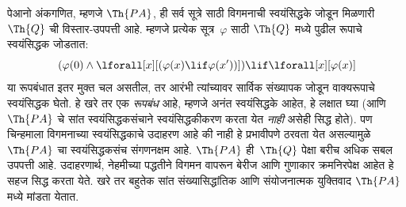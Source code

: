 पेआनो अंकगणित, म्हणजे $\Th{PA}$, ही
सर्व सूत्रे साठी विगमनाची स्वयंसिद्धके
जोडून मिळणारी $\Th{Q}$ ची विस्तार-उपपत्ती
आहे. म्हणजे प्रत्येक सूत्र~$\varphi$
साठी $\Th{Q}$ मध्ये पुढील रूपाचे
स्वयंसिद्धक जोडतात:
\[(\varphi(0) \land \lforall[x][(\varphi(x) \lif \varphi(x'))]) \lif \lforall[x][\varphi(x)]
\]
या रूपबंधात इतर मुक्त चल असतील, तर आरंभी त्यांच्यावर
सार्विक संख्यापक जोडून वाक्यरूपाचे स्वयंसिद्धक घेतो.
हे खरे तर एक \emph{रूपबंध} आहे, म्हणजे
अनंत स्वयंसिद्धके आहेत, हे लक्षात घ्या
(आणि $\Th{PA}$ चे सांत
स्वयंसिद्धकसंचाने स्वयंसिद्धकीकरण करता येत
{\em नाही} असेही सिद्ध होते).
पण चिन्हमाला विगमनाच्या
स्वयंसिद्धकाचे उदाहरण आहे
की नाही हे प्रभावीपणे ठरवता
येत असल्यामुळे $\Th{PA}$
चा स्वयंसिद्धकसंच संगणनक्षम
आहे. $\Th{PA}$ ही~$\Th{Q}$
पेक्षा बरीच अधिक सबल
उपपत्ती आहे. उदाहरणार्थ,
नेहमीच्या पद्धतीने विगमन
वापरून बेरीज आणि गुणाकार
क्रमनिरपेक्ष आहेत हे
सहज सिद्ध करता येते.
खरे तर बहुतेक सांत
संख्यासिद्धांतिक आणि
संयोजनात्मक युक्तिवाद
$\Th{PA}$ मध्ये मांडता येतात.

